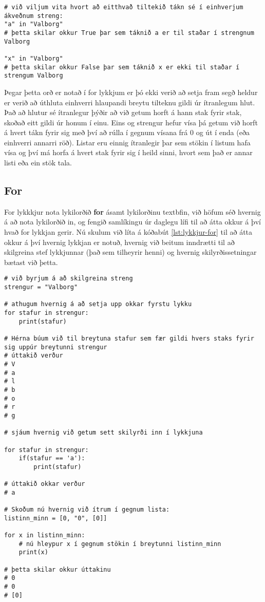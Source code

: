\begin{lstlisting}[caption=Lykilorðið in, label=lst:lykkjur-in]
# við viljum vita hvort að eitthvað tiltekið tákn sé í einhverjum ákveðnum streng:
"a" in "Valborg"
# þetta skilar okkur True þar sem táknið a er til staðar í strengnum Valborg

"x" in "Valborg"
# þetta skilar okkur False þar sem táknið x er ekki til staðar í strengum Valborg
\end{lstlisting}

Þegar þetta orð er notað í for lykkjum er þó ekki verið að setja fram segð heldur er verið að úthluta einhverri hlaupandi breytu tilteknu gildi úr ítranlegum hlut.
Það að hlutur sé ítranlegur þýðir að við getum horft á hann stak fyrir stak, skoðað eitt gildi úr honum í einu.
Eins og strengur hefur vísa þá getum við horft á hvert tákn fyrir sig með því að rúlla í gegnum vísana frá 0 og út í enda (eða einhverri annarri röð).
Listar eru einnig ítranlegir þar sem stökin í listum hafa vísa og því má horfa á hvert stak fyrir sig í heild sinni, hvort sem það er annar listi eða ein stök tala.

\subsection{For}
For lykkkjur nota lykilorðið \textbf{for} ásamt lykilorðinu textbf{in}, við höfum séð hvernig á að nota lykilorðið in, og fengið samlíkingu úr daglegu lífi til að átta okkur á því hvað for lykkjan gerir.
Nú skulum við líta á kóðabút \ref{lst:lykkjur-for} til að átta okkur á því hvernig lykkjan er notuð, hvernig við beitum inndrætti til að skilgreina stef lykkjunnar (það sem tilheyrir henni) og hvernig skilyrðissetningar bætast við þetta.

\begin{lstlisting}[caption=For lykkjur, label=lst:lykkjur-for]
# við byrjum á að skilgreina streng
strengur = "Valborg"

# athugum hvernig á að setja upp okkar fyrstu lykku
for stafur in strengur:
	print(stafur)

# Hérna búum við til breytuna stafur sem fær gildi hvers staks fyrir sig uppúr breytunni strengur
# úttakið verður
# V
# a
# l
# b
# o
# r
# g

# sjáum hvernig við getum sett skilyrði inn í lykkjuna

for stafur in strengur:
	if(stafur == 'a'):
		print(stafur)
		
# úttakið okkar verður
# a

# Skoðum nú hvernig við ítrum í gegnum lista:
listinn_minn = [0, "0", [0]]

for x in listinn_minn:
	# nú hleypur x í gegnum stökin í breytunni listinn_minn
	print(x)
	
# þetta skilar okkur úttakinu
# 0
# 0
# [0]
\end{lstlisting}

